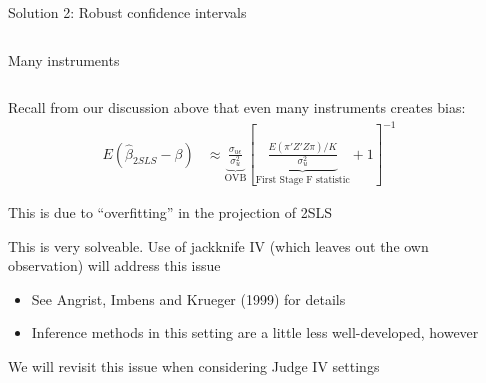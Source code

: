 \documentclass[notes,11pt, aspectratio=169]{beamer}
\newenvironment{wideitemize}{\itemize\addtolength{\itemsep}{10pt}}{\enditemize}
\begin{document}
\begin{frame}{Solution 2: Robust confidence intervals}
\begin{columns}[T]
\begin{column}{0.5\textwidth}
    \end{column}
  \end{columns}
\end{frame}


\begin{frame}{Many instruments}
  \begin{columns}[T] %
    \begin{column}{0.8\textwidth}
      \begin{wideitemize}
      \item Recall from our discussion above that even many instruments creates bias:
    \begin{align*}
      E(\hat{\beta}_{2SLS} - \beta) &\approx \underbrace{\frac{\sigma_{u\epsilon}}{\sigma^{2}_{u}}}_{\text{OVB}}\left[\underbrace{\frac{E(\pi'Z'Z\pi)/K}{\sigma^{2}_{u}}}_{\text{First Stage  F statistic}} + 1\right]^{-1}
    \end{align*}
  \item This is due to ``overfitting'' in the projection of 2SLS
  \item This is very solveable. Use of jackknife IV (which leaves out
    the own observation) will address this issue
    \begin{itemize}
    \item See Angrist, Imbens and Krueger (1999) for details
    \item Inference methods in this setting are a little less well-developed, however
    \end{itemize}
  \item We will revisit this issue when considering Judge IV settings
      \end{wideitemize}
    \end{column}
    \begin{column}{0.5\textwidth}
    \end{column}
  \end{columns}
\end{frame}
\end{document}
